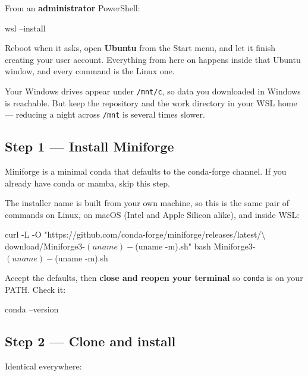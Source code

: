 \documentclass[11pt,a4paper]{article}
\newcommand{\cm}[1]{\texttt{\small #1}}
\begin{document}
From an \textbf{administrator} PowerShell:

\begin{cmd}
\begin{cmdtext}
wsl --install
\end{cmdtext}
\end{cmd}

Reboot when it asks, open \textbf{Ubuntu} from the Start menu, and let it finish
creating your user account. Everything from here on happens inside that Ubuntu
window, and every command is the Linux one.

\begin{caution}
Your Windows drives appear under \cm{/mnt/c}, so data you downloaded in Windows
is reachable. But keep the repository and the work directory in your WSL home
--- reducing a night across \cm{/mnt} is several times slower.
\end{caution}

\subsection{Step 1 --- Install Miniforge}
Miniforge is a minimal conda that defaults to the conda-forge channel. If you
already have conda or mamba, skip this step.

The installer name is built from your own machine, so this is the same pair of
commands on Linux, on macOS (Intel and Apple Silicon alike), and inside WSL:

\begin{cmd}
\begin{cmdtext}
curl -L -O "https://github.com/conda-forge/miniforge/releases/latest/\textbackslash{}
download/Miniforge3-$(uname)-$(uname -m).sh"
bash Miniforge3-$(uname)-$(uname -m).sh
\end{cmdtext}
\end{cmd}

Accept the defaults, then \textbf{close and reopen your terminal} so \cm{conda}
is on your PATH. Check it:

\begin{cmd}
\begin{cmdtext}
conda --version
\end{cmdtext}
\end{cmd}

\subsection{Step 2 --- Clone and install}
Identical everywhere:
\end{document}
